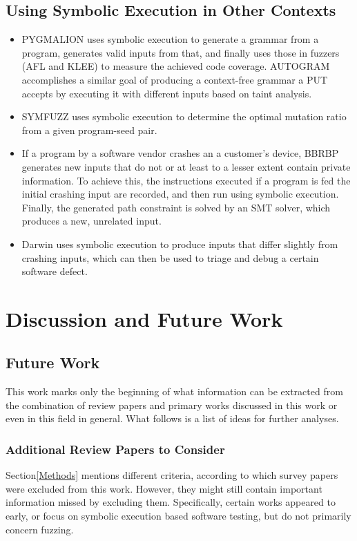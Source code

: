 \documentclass{article}
\begin{document}
\begin{multicols}{2}
    \subsection{Using Symbolic Execution in Other Contexts}
    \begin{itemize}
        \item PYGMALION\cite{PYGMALION} uses symbolic execution to generate a grammar from a program, generates valid inputs from that, and finally uses those in fuzzers (AFL\cite{AFLPlusPlus} and KLEE\cite{KLEE}) to measure the achieved code coverage. AUTOGRAM\cite{AUTOGRAM} accomplishes a similar goal of producing a context-free grammar a PUT accepts by executing it with different inputs based on taint analysis.
        \item SYMFUZZ\cite{SYMFUZZ} uses symbolic execution to determine the optimal mutation ratio from a given program-seed pair.
        \item If a program by a software vendor crashes an a customer's device, BBRBP\cite{BBRBP} generates new inputs that do not or at least to a lesser extent contain private information. To achieve this, the instructions executed if a program is fed the initial crashing input are recorded, and then run using symbolic execution. Finally, the generated path constraint is solved by an SMT solver, which produces a new, unrelated input.
        \item Darwin\cite{Darwin} uses symbolic execution to produce inputs that differ slightly from crashing inputs, which can then be used to triage and debug a certain software defect.
    \end{itemize}

    \section{Discussion and Future Work}
    \label{Discussion}
    \subsection{Future Work}
    This work marks only the beginning of what information can be extracted from the combination of review papers and primary works discussed in this work or even in this field in general. What follows is a list of ideas for further analyses.

    \subsubsection{Additional Review Papers to Consider}
    Section\ref{Methods} mentions different criteria, according to which survey papers were excluded from this work. However, they might still contain important information missed by excluding them. Specifically, certain works appeared to early\cite{AutomaticTestDataGeneration, BruteForceVulnDiscovery,BreakingSoftware}, or focus on symbolic execution based software testing, but do not primarily concern fuzzing\cite{DSETestGeneration, SurveySymbex, SearchStrategies, NewTrendsSymbex, ReviewConcolicTesting}.


\end{multicols}
\end{document}
